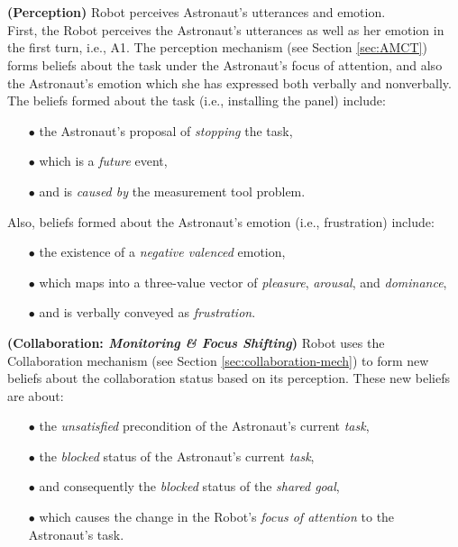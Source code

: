 \noindent{}\\ \\

\noindent \textbf{(Perception)} Robot perceives Astronaut's utterances and
emotion.\\
  
First, the Robot perceives the Astronaut's utterances as well as her emotion in
the first turn, i.e., A1. The perception mechanism (see Section \ref{sec:AMCT})
forms beliefs about the task under the Astronaut's focus of attention, and also
the Astronaut's emotion which she has expressed both verbally and nonverbally.
The beliefs formed about the task (i.e., installing the panel) include:

\begin{itemize}
  \item[$\bullet$] the Astronaut's proposal of \textit{stopping} the task,
  \item[$\bullet$] which is a \textit{future} event,
  \item[$\bullet$] and is \textit{caused by} the measurement tool problem.
\end{itemize}

\noindent Also, beliefs formed about the Astronaut's emotion (i.e., frustration)
include:

\begin{itemize}
  \item[$\bullet$] the existence of a \textit{negative valenced} emotion,
  \item[$\bullet$] which maps into a three-value vector of \textit{pleasure},
  \textit{arousal}, and \textit{dominance},
  \item[$\bullet$] and is verbally conveyed as \textit{frustration}.\\
\end{itemize}

\noindent\textbf{(Collaboration: \textit{Monitoring \& Focus Shifting})} Robot
uses the Collaboration mechanism (see Section \ref{sec:collaboration-mech}) to
form new beliefs about the collaboration status based on its perception. These
new beliefs are about:

\begin{itemize}
  \item[$\bullet$] the \textit{unsatisfied} precondition of the Astronaut's
  current \textit{task},
  \item[$\bullet$] the \textit{blocked} status of the Astronaut's current
  \textit{task},
  \item[$\bullet$] and consequently the \textit{blocked} status of the
  \textit{shared goal},
  \item[$\bullet$] which causes the change in the Robot's \textit{focus of
  attention} to the Astronaut's task.
\end{itemize}


